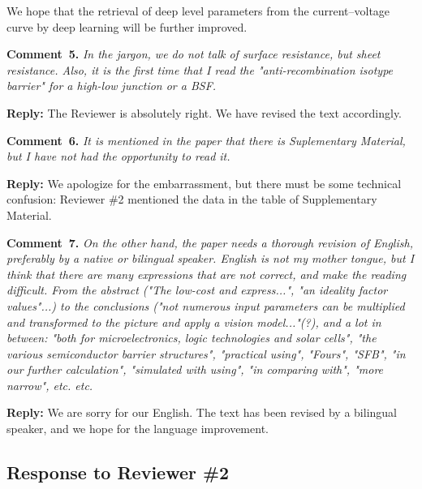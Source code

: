 \documentclass[num-refs]{wiley-article} %
\begin{document}
We hope that the  retrieval of deep level parameters 
from the current--voltage curve by deep learning 
will be further improved. 

\vspace{1cm}
\noindent
\textcolor[rgb]{0.00,0.50,1.00}{\textbf{Comment~5.}}
\emph{In the jargon, we do not talk of surface resistance, but sheet resistance.
Also, it is the first time that I read the "anti-recombination isotype barrier" for a high-low junction or a BSF.}

\vspace{0.5cm}
\noindent
\textcolor[rgb]{0.51,0.00,0.00}{\textbf{Reply:}}
The Reviewer is absolutely right.
We have revised the text accordingly.

\vspace{1cm}
\noindent
\textcolor[rgb]{0.00,0.50,1.00}{\textbf{Comment~6.}}
\emph{It is mentioned in the paper that there is Suplementary Material, but I have not had the opportunity to read it.}

\vspace{0.5cm}
\noindent
\textcolor[rgb]{0.51,0.00,0.00}{\textbf{Reply:}}
We apologize for the embarrassment, but there must be some technical confusion:
Reviewer \#2 mentioned the data in the table of Supplementary Material.


\vspace{1cm}
\noindent
\textcolor[rgb]{0.00,0.50,1.00}{\textbf{Comment~7.}}
\emph{On the other hand, the paper needs a thorough revision of English, preferably by a native or bilingual speaker.
English is not my mother tongue, but I think that there are many expressions that are not correct, and make the reading difficult.
From the abstract ("The low-cost and express...", "an ideality factor values"...)
to the conclusions ("not numerous input parameters can be multiplied and transformed to the picture and apply a vision model..."(?),
and a lot in between: "both for microelectronics, logic technologies and solar cells",
"the various semiconductor barrier structures", "practical using", "Fours", "SFB", "in our further calculation",
"simulated with using", "in comparing with", "more narrow", etc. etc. }

\vspace{0.5cm}
\noindent
\textcolor[rgb]{0.51,0.00,0.00}{\textbf{Reply:}}
We are sorry for our English. 
The text has been revised by a bilingual speaker, and we hope for the language improvement.



\subsection*{Response to Reviewer \#2 }
\end{document}

